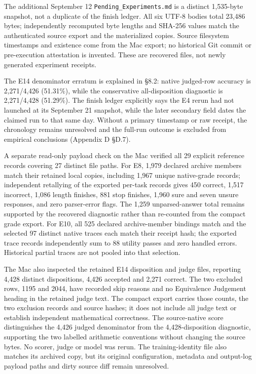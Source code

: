 \documentclass[12pt,a4paper]{report}
\begin{document}
The additional September 12 \texttt{Pending\_Experiments.md} is a
distinct 1,535-byte snapshot, not a duplicate of the finish ledger. All
six UTF-8 bodies total 23,486 bytes; independently recomputed byte
lengths and SHA-256 values match the authenticated source export and the
materialized copies. Source filesystem timestamps and existence come
from the Mac export; no historical Git commit or pre-execution
attestation is invented. These are recovered files, not newly generated
experiment receipts.

The E14 denominator erratum is explained in §8.2: native judged-row
accuracy is 2,271/4,426 (51.31\%), while the conservative
all-disposition diagnostic is 2,271/4,428 (51.29\%). The finish ledger
explicitly says the E4 rerun had not launched at its September 21
snapshot, while the later secondary field dates the claimed run to that
same day. Without a primary timestamp or raw receipt, the chronology
remains unresolved and the full-run outcome is excluded from empirical
conclusions (Appendix D §D.7).

A separate read-only payload check on the Mac verified all 29 explicit
reference records covering 27 distinct file paths. For E8, 1,979
declared archive members match their retained local copies, including
1,967 unique native-grade records; independent retallying of the
exported per-task records gives 450 correct, 1,517 incorrect, 1,086
length finishes, 881 stop finishes, 1,960 sure and seven unsure
responses, and zero parser-error flags. The 1,259 unparsed-answer total
remains supported by the recovered diagnostic rather than re-counted
from the compact grade export. For E10, all 525 declared archive-member
bindings match and the selected 97 distinct native traces each match
their receipt hash; the exported trace records independently sum to 88
utility passes and zero handled errors. Historical partial traces are
not pooled into that selection.

The Mac also inspected the retained E14 disposition and judge files,
reporting 4,428 distinct dispositions, 4,426 accepted and 2,271 correct.
The two excluded rows, 1195 and 2044, have recorded skip reasons and no
Equivalence Judgement heading in the retained judge text. The compact
export carries those counts, the two exclusion records and source
hashes; it does not include all judge text or establish independent
mathematical correctness. The source-native score distinguishes the
4,426 judged denominator from the 4,428-disposition diagnostic,
supporting the two labelled arithmetic conventions without changing the
source bytes. No scorer, judge or model was rerun. The training-identity
file also matches its archived copy, but its original configuration,
metadata and output-log payload paths and dirty source diff remain
unresolved.
\end{document}
